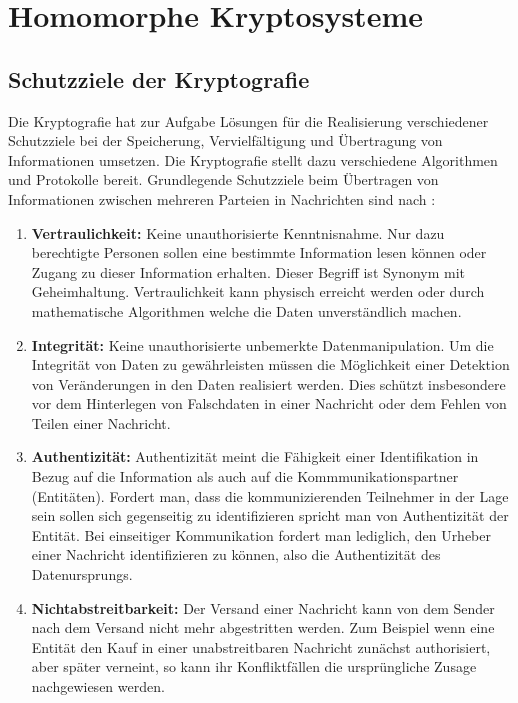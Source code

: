 \chapter{Homomorphe Kryptosysteme}
\label{HK}

\section{Schutzziele der Kryptografie}
Die Kryptografie hat zur Aufgabe Lösungen für die Realisierung verschiedener Schutzziele bei der Speicherung, Vervielfältigung und Übertragung von Informationen umsetzen. Die Kryptografie stellt dazu verschiedene Algorithmen und Protokolle bereit. Grundlegende Schutzziele beim Übertragen von Informationen zwischen mehreren Parteien in  Nachrichten sind nach \cite[p.4]{menezes1996handbook}\cite[p.2]{delfs2002introduction}:
\begin{enumerate}
	\item \textbf{Vertraulichkeit:} Keine unauthorisierte Kenntnisnahme. Nur dazu berechtigte Personen sollen eine bestimmte Information lesen können oder Zugang zu dieser Information erhalten. Dieser Begriff ist Synonym mit Geheimhaltung. Vertraulichkeit kann physisch erreicht werden oder durch mathematische Algorithmen welche die Daten unverständlich machen. 
	\item \textbf{Integrität:} Keine unauthorisierte unbemerkte Datenmanipulation. Um die Integrität von Daten zu gewährleisten müssen die Möglichkeit einer Detektion von Veränderungen in den Daten realisiert werden.  Dies schützt insbesondere vor dem Hinterlegen von Falschdaten in einer Nachricht oder dem Fehlen von Teilen einer Nachricht.
	\item \textbf{Authentizität:} Authentizität meint die Fähigkeit einer Identifikation in Bezug auf die Information als auch auf die Kommmunikationspartner (Entitäten). Fordert man, dass die kommunizierenden Teilnehmer in der Lage sein sollen sich gegenseitig zu identifizieren spricht man von Authentizität der Entität. Bei einseitiger Kommunikation fordert man lediglich, den Urheber einer Nachricht identifizieren zu können, also die Authentizität des Datenursprungs.
	\item \textbf{Nichtabstreitbarkeit:} Der Versand einer Nachricht kann von dem Sender nach dem Versand nicht mehr abgestritten werden. Zum Beispiel wenn eine Entität den Kauf in einer unabstreitbaren Nachricht zunächst authorisiert, aber später verneint, so kann ihr Konfliktfällen die ursprüngliche Zusage nachgewiesen werden.
\end{enumerate}

